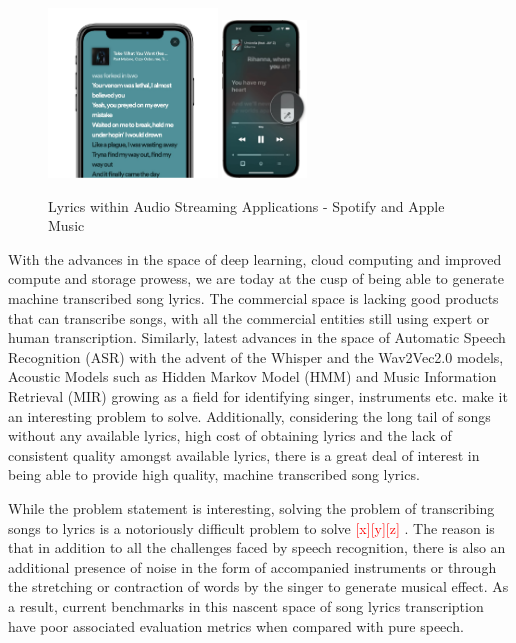 \begin{figure}
    \centering
    \includegraphics[width=0.4\textwidth]{01-introduction/figures/spotify_lyrics.pdf}
    \includegraphics[width=0.2\textwidth]{01-introduction/figures/applemusic_lyrics.pdf}
    \caption{Lyrics within Audio Streaming Applications - Spotify and Apple Music}%
    \label{fig:setup0}
\end{figure}

With the advances in the space of deep learning, cloud computing and improved compute and storage prowess, we are today at the cusp of being able to generate machine transcribed song lyrics. The commercial space is lacking good products that can transcribe songs, with all the commercial entities still using expert or human transcription. Similarly, latest advances in the space of Automatic Speech Recognition (ASR) with the advent of the Whisper and the Wav2Vec2.0 models, Acoustic Models such as Hidden Markov Model (HMM) and Music Information Retrieval (MIR) growing as a field for identifying singer, instruments etc. make it an interesting problem to solve. Additionally, considering the long tail of songs without any available lyrics, high cost of obtaining lyrics and the lack of consistent quality amongst available lyrics, there is a great deal of interest in being able to provide high quality, machine transcribed song lyrics. 

While the problem statement is interesting, solving the problem of transcribing songs to lyrics is a notoriously difficult problem to solve \textcolor{red}{[x][y][z]} . The reason is that in addition to all the challenges faced by speech recognition, there is also an additional presence of noise in the form of accompanied instruments or through the stretching or contraction of words by the singer to generate musical effect. As a result, current benchmarks in this nascent space of song lyrics transcription have poor associated evaluation metrics when compared with pure speech.

